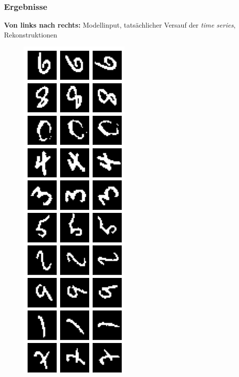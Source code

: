 \begin{frame}
\frametitle{Ergebnisse}
\textbf{Von links nach rechts:} Modellinput, tatsächlicher Versauf der \emph{time series}, Rekonstruktionen 
\begin{figure}[h!]
	\begin{minipage}{0.115\textwidth}
			\center{}
			\includegraphics[scale=0.19]{Bilder/MNISTorig1}
	\end{minipage}
	\begin{minipage}{0.26\textwidth}
			\center{}

\end{minipage}
\end{figure}
\end{frame}
